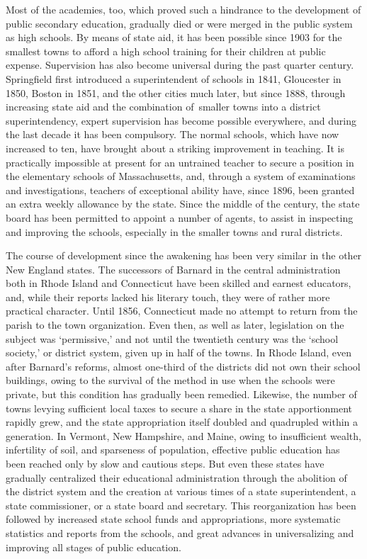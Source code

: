\documentclass[]{book}
\begin{document}
Most of the academies, too, which proved such a hindrance to the development of public secondary education, gradually died or were merged in the public system as high schools. By means of state aid, it has been possible since 1903 for the smallest towns to afford a high school training for their children at public expense. Supervision has also become universal during the past quarter century. Springfield first introduced a superintendent of schools in 1841, Gloucester in 1850, Boston in 1851, and the other cities much later, but since 1888, through increasing state aid and the combination of~smaller towns into a district superintendency, expert supervision has become possible everywhere, and during the last decade it has been compulsory. The normal schools, which have now increased to ten, have brought about a striking improvement in teaching. It is practically impossible at present for an untrained teacher to secure a position in the elementary schools of Massachusetts, and, through a system of examinations and investigations, teachers of exceptional ability have, since 1896, been granted an extra weekly allowance by the state. Since the middle of the century, the state board has been permitted to appoint a number of agents, to assist in inspecting and improving the schools, especially in the smaller towns and rural districts.

The course of development since the awakening has been very similar in the other New England states. The successors of Barnard in the central administration both in Rhode Island and Connecticut have been skilled and earnest educators, and, while their reports lacked his literary touch, they were of rather more practical character. Until 1856, Connecticut made no attempt to return from the parish to the town organization. Even then, as well as later, legislation on the subject was `permissive,' and not until the twentieth century was the `school society,' or district system, given up in half of the towns. In Rhode Island, even after Barnard's reforms, almost one-third of the districts did not own their school buildings, owing to the survival of the method in use when the schools were private, but this condition has gradually been remedied. Likewise, the number of towns levying sufficient local taxes to secure a share in the state apportionment rapidly grew, and the state appropriation itself doubled and quadrupled within a generation. In Vermont, New Hampshire, and Maine, owing to insufficient wealth, infertility of soil, and sparseness of population, effective public education has been reached only by slow and cautious steps. But even these states have gradually centralized their educational administration through the abolition of the district system and the creation at various times of a state superintendent, a state commissioner, or a state board and secretary. This reorganization has been followed by increased state school funds and appropriations, more systematic statistics and reports from the schools, and great advances in universalizing and improving all stages of public education.
\end{document}
